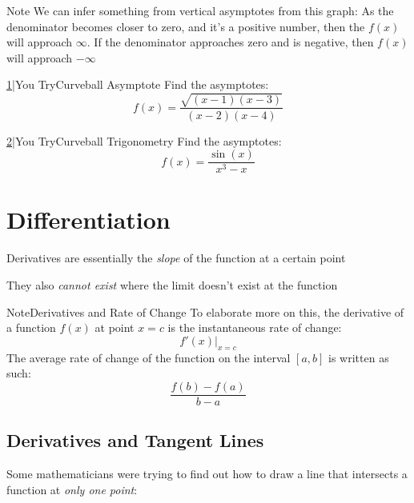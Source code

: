\documentclass{MathNotes}
\newenvironment{note}[1]{\begin{YellowBox}{Note}{#1}}{\end{YellowBox}}
\newenvironment{practice}[2]{\begin{PurpleBox}{\texorpdfstring{#1}\Big|You Try}{#2}}{\end{PurpleBox}}
\begin{document}
\begin{note}{}
	We can infer something from vertical asymptotes from this graph:
	As the denominator becomes closer to zero, and it's a positive number, then
	the $f(x)$ will approach $\infty$. If the denominator approaches zero and
	is negative, then $f(x)$ will approach $-\infty$
\end{note}

\begin{multicols}{2}
	\begin{practice}{\hyperref[ans:1.3.3-1]{1}}{Curveball Asymptote}\label{prac:1.3.3-1}
		Find the asymptotes:
		\begin{displaymath}
			f(x)=\frac{\sqrt{(x-1)(x-3)}}{(x-2)(x-4)}
		\end{displaymath}
	\end{practice}

	\begin{practice}{\hyperref[ans:1.3.3-2]{2}}{Curveball Trigonometry}\label{prac:1.3.3-2}
		Find the asymptotes:
		\begin{displaymath}
			f(x)=\frac{\sin(x)}{x^3-x}
		\end{displaymath}
	\end{practice}
\end{multicols}

\newpage
\section{Differentiation}
Derivatives are essentially the \textit{slope} of the function at a
certain point

They also \textit{cannot exist} where the limit doesn't exist at the
function

\begin{note}{Derivatives and Rate of Change}
	To elaborate more on this, the derivative of a function $f(x)$ at point $x=c$
	is the instantaneous rate of change: $$f'(x)\Big|_{x=c}$$ The average rate of
	change of the function on the interval $[a, b]$ is written as such:
	$$\frac{f(b)-f(a)}{b-a}$$
\end{note}

\subsection{Derivatives and Tangent Lines}
\begin{multicols}{2}
	Some mathematicians were trying to find out how to draw a line that intersects
	a function at \textit{only one point}:
	\begin{center}
		
	\end{center}
\end{multicols}
\end{document}
